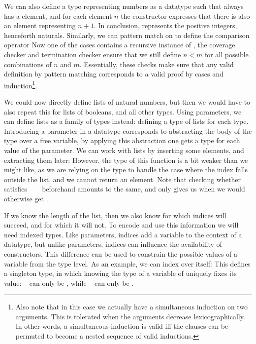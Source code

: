 We can also define a type representing numbers as a datatype
such that \bN{} always has a  element, and for each element $n$ the constructor  expresses that there is also an element representing $n + 1$. In conclusion, \bN{} represents the positive integers, henceforth naturals. Similarly, we can pattern match on \bN{} to define the comparison operator
Now one of the cases contains a recursive instance of \bN{}, the coverage checker and termination checker ensure that we still define $n < m$ for all possible combinations of $n$ and $m$. Essentially, these checks make sure that any valid definition by pattern matching corresponds to a valid proof by cases and induction\footnote{Also note that in this case we actually have a simultaneous induction on two arguments. This is tolerated when the arguments decrease lexicographically. In other words, a simultaneous induction is valid iff the clauses can be permuted to become a nested sequence of valid inductions.}.

We could now directly define lists of natural numbers, but then we would have to also repeat this for lists of booleans, and all other types. Using parameters, we can define lists as a family of types instead:
defining a type of lists for each type. Introducing a parameter in a datatype corresponds to abstracting the body of the type over a free variable, by applying this abstraction one gets a type for each value of the parameter.
We can work with lists by inserting some elements, and extracting them later:
However, the type of this function is a bit weaker than we might like, as we are relying on the type
to handle the case where the index falls outside the list, and we cannot return an element. Note that checking whether
satisfies \ \AF{<}\ \  beforehand amounts to the same, and only gives us  when we would otherwise get .

If we know the length of the list, then we also know for which indices  will succeed, and for which it will not. To encode and use this information we will need indexed types. Like parameters, indices add a variable to the context of a datatype, but unlike parameters, indices can influence the availability of constructors. This difference can be used to constrain the possible values of a variable from the type level. As an example, we can index  over itself:
This defines a singleton type, in which knowing the type of a variable of uniquely fixes its value: \  can only be , while \  can only be .

